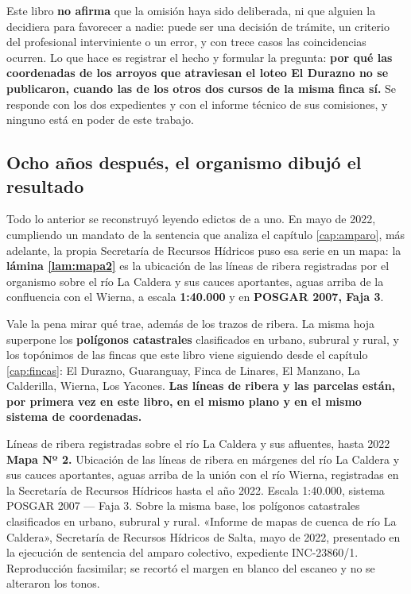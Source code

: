 \begin{cautela}
Este libro \textbf{no afirma} que la omisión haya sido deliberada, ni que alguien la decidiera para favorecer a nadie: puede ser una decisión de trámite, un criterio del profesional interviniente o un error, y con trece casos las coincidencias ocurren. Lo que hace es registrar el hecho y formular la pregunta: \textbf{por qué las coordenadas de los arroyos que atraviesan el loteo El Durazno no se publicaron, cuando las de los otros dos cursos de la misma finca sí.} Se responde con los dos expedientes y con el informe técnico de sus comisiones, y ninguno está en poder de este trabajo.
\end{cautela}

\subsection*{Ocho años después, el organismo dibujó el resultado}

Todo lo anterior se reconstruyó leyendo edictos de a uno. En mayo de 2022, cumpliendo un
mandato de la sentencia que analiza el capítulo \ref{cap:amparo}, más adelante, la propia Secretaría de Recursos Hídricos
puso esa serie en un mapa: la \textbf{lámina \ref{lam:mapa2}} es la ubicación de las líneas de
ribera registradas por el organismo sobre el río La Caldera y sus cauces aportantes, aguas
arriba de la confluencia con el Wierna, a escala \textbf{1:40.000} y en \textbf{POSGAR 2007,
Faja 3}.

Vale la pena mirar qué trae, además de los trazos de ribera. La misma hoja superpone los
\textbf{polígonos catastrales} clasificados en urbano, subrural y rural, y los topónimos de las
fincas que este libro viene siguiendo desde el capítulo \ref{cap:fincas}: El Durazno, Guaranguay, Finca de
Linares, El Manzano, La Calderilla, Wierna, Los Yacones. \textbf{Las líneas de ribera y las
parcelas están, por primera vez en este libro, en el mismo plano y en el mismo sistema de coordenadas.}

%
{Líneas de ribera registradas sobre el río La Caldera y sus afluentes, hasta 2022}%
{\textbf{Mapa Nº 2.} Ubicación de las líneas de ribera en márgenes del río La Caldera y sus
cauces aportantes, aguas arriba de la unión con el río Wierna, registradas en la Secretaría de
Recursos Hídricos hasta el año 2022. Escala 1:40.000, sistema POSGAR 2007 --- Faja 3. Sobre la
misma base, los polígonos catastrales clasificados en urbano, subrural y rural.}%
{«Informe de mapas de cuenca de río La Caldera», Secretaría de Recursos Hídricos de Salta, mayo
de 2022, presentado en la ejecución de sentencia del amparo colectivo, expediente
INC-23860/1. Reproducción facsimilar; se recortó el margen en blanco del escaneo y no se
alteraron los tonos.}

